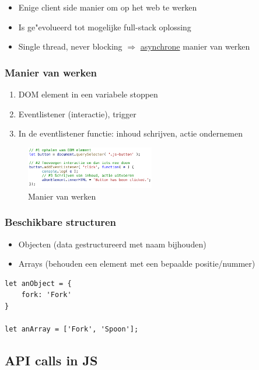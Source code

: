\documentclass{article}
\begin{document}
\begin{itemize}
    \item Enige client side manier om op het web te werken
    \item Is ge"evolueerd tot mogelijke full-stack oplossing
    \item Single thread, never blocking $\Rightarrow$ \underline{asynchrone} manier van werken
\end{itemize}

\subsubsection{Manier van werken}

\begin{enumerate}
    \item DOM element in een variabele stoppen
    \item Eventlistener (interactie), trigger
    \item In de eventlistener functie: inhoud schrijven, actie ondernemen
\end{enumerate}

\begin{figure}[H]
    \centering
    \includegraphics[width=0.5\textwidth]{js-manier-van-werken.png}
    \caption{Manier van werken}
\end{figure}

\subsubsection{Beschikbare structuren}

\begin{itemize}
    \item Objecten (data gestructureerd met naam bijhouden)
    \item Arrays (behouden een element met een bepaalde positie/nummer)
\end{itemize}

\begin{lstlisting}
let anObject = {
    fork: 'Fork'
}

let anArray = ['Fork', 'Spoon'];
\end{lstlisting}


\subsection{API calls in JS}
\end{document}
